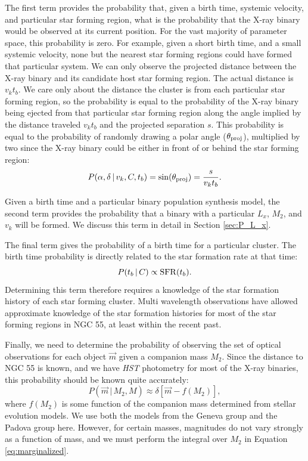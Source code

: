 \documentclass[12pt, preprint]{aastex}
\newcommand{\given}{\,|\,}
\begin{document}
The first term provides the probability that, given a birth time, systemic velocity, and particular star forming region, what is the probability that the X-ray binary would be observed at its current position. For the vast majority of parameter space, this probability is zero. For example, given a short birth time, and a small systemic velocity, none but the nearest star forming regions could have formed that particular system. We can only observe the projected distance between the X-ray binary and its candidate host star forming region. The actual distance is $v_k t_b$. We care only about the distance the cluster is from each particular star forming region, so the probability is equal to the probability of the X-ray binary being ejected from that particular star forming region along the angle implied by the distance traveled $v_k t_b$ and the projected separation $s$. This probability is equal to the probability of randomly drawing a polar angle ($\theta_{\rm proj}$), multiplied by two since the X-ray binary could be either in front of or behind the star forming region:
\begin{equation}
P(\alpha, \delta \given v_k, C, t_b) = \sin (\theta_{\rm proj}) = \frac{s}{v_k t_b}.
\end{equation}

Given a birth time and a particular binary population synthesis model, the second term provides the probability that a binary with a particular $L_x$, $M_2$, and $v_k$ will be formed. We discuss this term in detail in Section \ref{sec:P_L_x}.

The final term gives the probability of a birth time for a particular cluster. The birth time probability is directly related to the star formation rate at that time:
\begin{equation}
P(t_b \given C) \propto {\rm SFR}(t_b).
\end{equation} 
Determining this term therefore requires a knowledge of the star formation history of each star forming cluster. Multi wavelength observations have allowed approximate knowledge of the star formation histories for most of the star forming regions in NGC 55, at least within the recent past.

Finally, we need to determine the probability of observing the set of optical observations for each object $\vec{m}$ given a companion mass $M_2$. Since the distance to NGC 55 is known, and we have {\it HST} photometry for most of the X-ray binaries, this probability should be known quite accurately:
\begin{equation}
P(\vec{m} \given M_2, M) \approx \delta\left[ \vec{m} - f(M_2) \right],
\end{equation}
where $f(M_2)$ is some function of the companion mass determined from stellar evolution models. We use both the models from the Geneva group and the Padova group here. However, for certain masses, magnitudes do not vary strongly as a function of mass, and we must perform the integral over $M_2$ in Equation \ref{eq:marginalized}.
\end{document}

